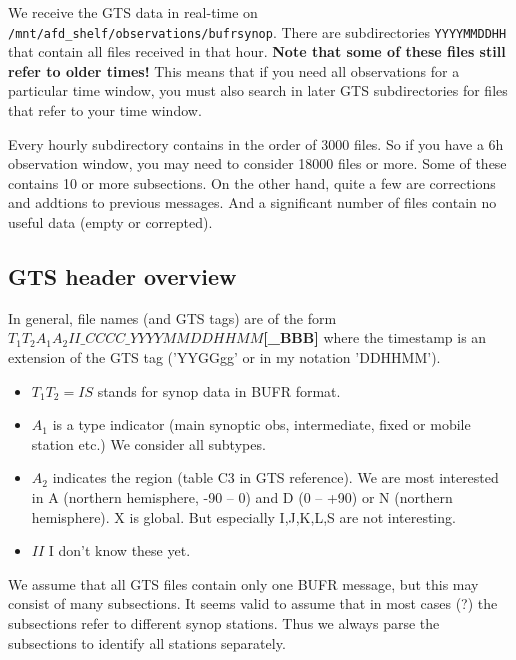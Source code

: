 \documentclass[10pt]{article}
\begin{document}
We receive the GTS data in real-time on \texttt{/mnt/afd\_shelf/observations/bufrsynop}. There are subdirectories \texttt{YYYYMMDDHH} that contain all files received in that hour. \textbf{Note that some of these files still refer to older times!} This means that if you need all observations for a particular time window, you must also search in later GTS subdirectories for files that refer to your time window.

Every hourly subdirectory contains in the order of 3000 files. So if you have a 6h observation window, you may need to consider 18000 files or more. Some of these contains 10 or more subsections. On the other hand, quite a few are corrections and addtions to previous messages. And a significant number of files contain no useful data (empty or correpted).

\subsection{GTS header overview}
In general, file names (and GTS tags) are of the form \textbf{$T_1T_2A_1A_2II\_CCCC\_YYYYMMDDHHMM$[\_BBB]} where the timestamp is an extension of the GTS tag ('YYGGgg' or in my notation 'DDHHMM').

\begin{itemize}
\item $T_1T_2 = IS$ stands for synop data in BUFR format.
\item $A_1$ is a type indicator (main synoptic obs, intermediate, fixed or mobile station etc.) We consider all subtypes.
\item $A_2$ indicates the region (table C3 in GTS reference). We are most interested in A (northern hemisphere, -90 -- 0) and D (0 -- +90) or N (northern hemisphere). X is global. But especially I,J,K,L,S are not interesting.
\item $II$ I don't know these yet. 
\end{itemize}

We assume that all GTS files contain only one BUFR message, but this may consist of many subsections. It seems valid to assume that in most cases (?) the subsections refer to different synop stations. Thus we always parse the subsections to identify all stations separately.
\end{document}
